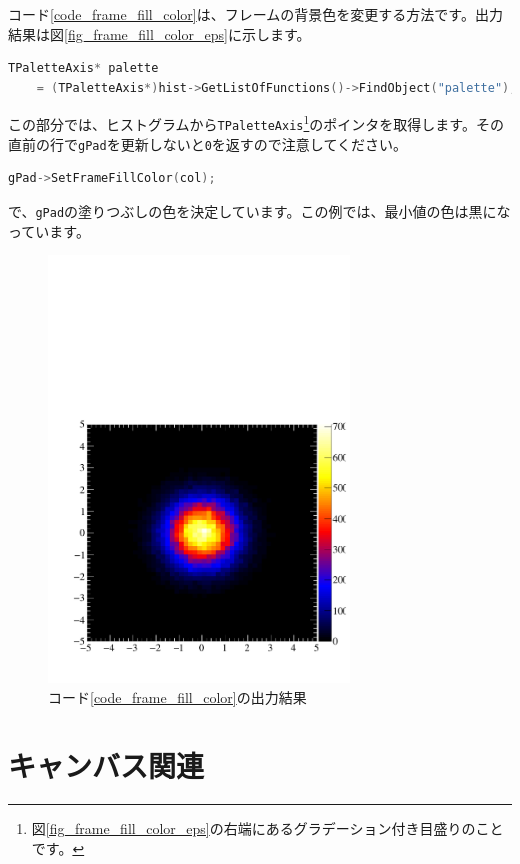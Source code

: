 \begin{NoFloat}

\end{NoFloat}

コード\ref{code_frame_fill_color}は、フレームの背景色を変更する方法です。出力結果は図\ref{fig_frame_fill_color_eps}に示します。

\begin{lstlisting}[language=C++]
  TPaletteAxis* palette 
    = (TPaletteAxis*)hist->GetListOfFunctions()->FindObject("palette"); 
\end{lstlisting}
この部分では、ヒストグラムから\texttt{TPaletteAxis}\footnote{図\ref{fig_frame_fill_color_eps}の右端にあるグラデーション付き目盛りのことです。}のポインタを取得します。その直前の行で\texttt{gPad}を更新しないと\texttt{0}を返すので注意してください。
\begin{lstlisting}[language=C++]
  gPad->SetFrameFillColor(col); 
\end{lstlisting}
で、\texttt{gPad}の塗りつぶしの色を決定しています。この例では、最小値の色は黒になっています。

\begin{figure}
  \centering
  \includegraphics[width=8cm,clip]{fig/frame_fill_color.pdf}
  \caption{コード\ref{code_frame_fill_color}の出力結果}
  \label{fig_frame_fill_color_pdf}
\end{figure}


\section{キャンバス関連}

